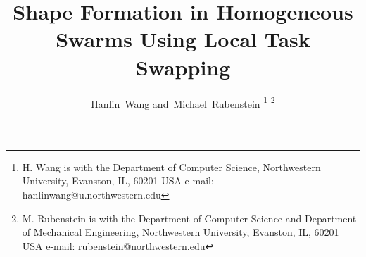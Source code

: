 \documentclass[journal]{IEEEtran}
\begin{document}
%

\title{Shape Formation in Homogeneous Swarms Using Local Task Swapping}
%
%
%

\author{Hanlin~Wang
        and~Michael~Rubenstein%
\thanks{H. Wang is with the Department
of Computer Science, Northwestern University, Evanston,
IL, 60201 USA e-mail: hanlinwang@u.northwestern.edu}%
\thanks{M. Rubenstein is with the Department of Computer Science and Department of Mechanical Engineering, Northwestern University, Evanston,
IL, 60201 USA e-mail: rubenstein@northwestern.edu}%

}

% 
%
\end{document}
